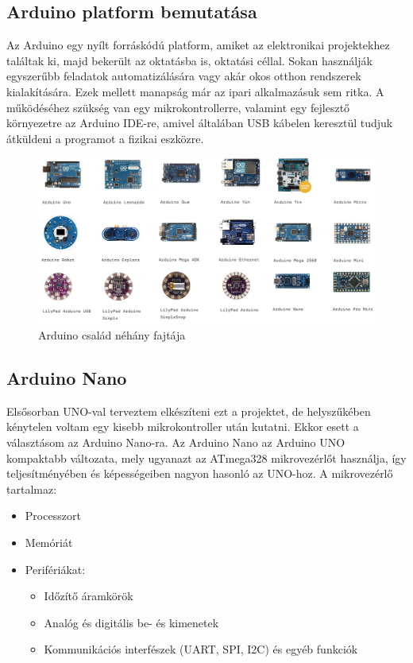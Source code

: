 \documentclass[]{thesis-ekf}
\theoremstyle{definition}
\theoremstyle{remark}
\begin{document}
\subsection{Arduino platform bemutatása}
Az Arduino\cite{arduino}\cite{whatisanarduino} egy nyílt forráskódú platform, amiket az elektronikai projektekhez találtak ki, majd bekerült az oktatásba is, oktatási céllal. Sokan használják egyszerűbb feladatok automatizálására vagy akár okos otthon rendszerek kialakítására. Ezek mellett manapság már az ipari alkalmazásuk sem ritka. A működéséhez szükség van egy mikrokontrollerre, valamint egy fejlesztő környezetre az Arduino IDE-re, amivel általában USB kábelen keresztül tudjuk átküldeni a programot a fizikai eszközre.
\begin{figure}[th!]
	\centering
	\includegraphics[width=0.9\linewidth]{ArduinoFamily}
	\caption[Arduino család néhány fajtája]{Arduino család néhány fajtája}
	\label{fig-arduinofamily}
\end{figure}
\subsection{Arduino Nano}
Elsősorban UNO-val\cite{arduinouno} terveztem elkészíteni ezt a projektet, de helyszűkében kénytelen voltam egy kisebb mikrokontroller után kutatni. Ekkor esett a választásom az Arduino Nano-ra\cite{arduinonano}. Az Arduino Nano az Arduino UNO kompaktabb változata, mely ugyanazt az ATmega328 mikrovezérlőt használja, így teljesítményében és képességeiben nagyon hasonló az UNO-hoz. A mikrovezérlő tartalmaz:
\begin{itemize}
	\item Processzort
	\item Memóriát
	\item Perifériákat:
	\begin{itemize}
		\item Időzítő áramkörök
		\item Analóg és digitális be- és kimenetek
		\item Kommunikációs interfészek (UART, SPI, I2C) és egyéb funkciók
	\end{itemize}
\end{itemize}
\end{document}
